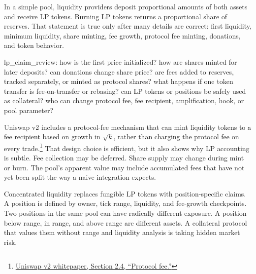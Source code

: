 In a simple pool, liquidity providers deposit proportional amounts of both assets and receive LP tokens. Burning LP tokens returns a proportional share of reserves. That statement is true only after many details are correct: first liquidity, minimum liquidity, share minting, fee growth, protocol fee minting, donations, and token behavior.

\begin{codeblock}
lp_claim_review:
    how is the first price initialized?
    how are shares minted for later deposits?
    can donations change share price?
    are fees added to reserves, tracked separately, or minted as protocol shares?
    what happens if one token transfer is fee-on-transfer or rebasing?
    can LP tokens or positions be safely used as collateral?
    who can change protocol fee, fee recipient, amplification, hook, or pool parameter?
\end{codeblock}

Uniswap v2 includes a protocol-fee mechanism that can mint liquidity tokens to a fee recipient based on growth in \(\sqrt{k}\), rather than charging the protocol fee on every trade.\footnote{\href{https://app.uniswap.org/whitepaper.pdf}{Uniswap v2 whitepaper, Section 2.4, ``Protocol fee.''}} That design choice is efficient, but it also shows why LP accounting is subtle. Fee collection may be deferred. Share supply may change during mint or burn. The pool's apparent value may include accumulated fees that have not yet been split the way a naive integration expects.

Concentrated liquidity replaces fungible LP tokens with position-specific claims. A position is defined by owner, tick range, liquidity, and fee-growth checkpoints. Two positions in the same pool can have radically different exposure. A position below range, in range, and above range are different assets. A collateral protocol that values them without range and liquidity analysis is taking hidden market risk.

